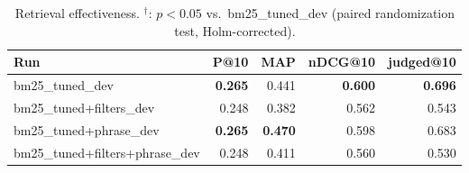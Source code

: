 \begin{table}[t]
\centering
\begin{tabular}{lrrrr}
\toprule
Run & P@10 & MAP & nDCG@10 & judged@10 \\
\midrule
bm25\_tuned\_dev & \textbf{0.265} & 0.441 & \textbf{0.600} & \textbf{0.696} \\
bm25\_tuned+filters\_dev & 0.248 & 0.382 & 0.562 & 0.543 \\
bm25\_tuned+phrase\_dev & \textbf{0.265} & \textbf{0.470} & 0.598 & 0.683 \\
bm25\_tuned+filters+phrase\_dev & 0.248 & 0.411 & 0.560 & 0.530 \\
\bottomrule
\end{tabular}
\caption{Retrieval effectiveness. $^\dagger$: $p<0.05$ vs.\ bm25\_tuned\_dev (paired randomization test, Holm-corrected).}
\end{table}
